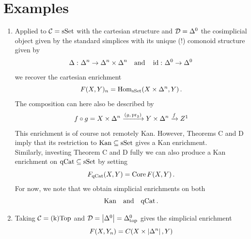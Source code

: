     \section{Examples}
        \begin{enumerate}[label=\roman*)]
            \item 
                Applied to $\mathcal{C} = \operatorname{sSet}$ with the cartesian structure and $\mathcal{D} = \Delta^0$ the cosimplicial object given by the standard simplices with its unique (!) comonoid structure given by
                \begin{equation*}
                    \Delta \,\colon \Delta^n \to \Delta^n \times \Delta^n \quad \text{and} \quad \operatorname{id} \,\colon \Delta^0 \to \Delta^0 
                \end{equation*}
                we recover the cartesian enrichment
                \begin{equation*}
                    F(X, Y)_n = \operatorname{Hom}_{\operatorname{sSet}}(X \times \Delta^n, Y) \,.
                \end{equation*}
                The composition can here also be described by
                \begin{equation*}
                    f \circ g = X \times \Delta^n \xrightarrow{(g, \, \pr_2)} Y \times \Delta^n \xrightarrow{f} Z\footnotemark
                \end{equation*}
                This enrichment is of course not remotely Kan. However, Theorems C and D imply that its restriction to $\mathrm{Kan} \subseteq \operatorname{sSet}$ gives a Kan enrichment.\\
                Similarly, investing Theorem C and D fully we can also produce a Kan enrichment on $\mathrm{qCat} \subseteq \operatorname{sSet}$ by setting
                \begin{equation*}
                    F_{\mathrm{qCat}}(X, Y) = \operatorname{Core} F(X, Y) \,.
                \end{equation*}
                For now, we note that we obtain simplicial enrichments on both
                \begin{equation*}
                    \mathrm{Kan} \quad \text{and} \quad \mathrm{qCat} \,.
                \end{equation*}
            \item 
                Taking $\mathcal{C} = \mathrm{(k)Top}$ and $\mathcal{D} = \left| \Delta^0 \right| = \Delta^0_{\mathrm{top}}$ gives the simplicial enrichment
                \begin{equation*}
                    F(X, Y_n) = C(X \times \gr{\Delta^n}, Y)

\end{equation*}
\end{enumerate}
